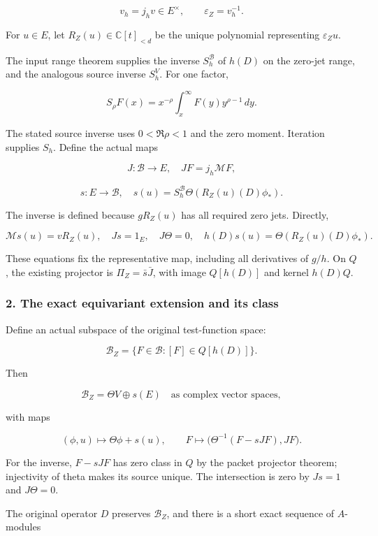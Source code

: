 \[v_h=j_hv\in E^\times,\qquad \varepsilon_Z=v_h^{-1}.\]

For \(u\in E\), let \(R_Z(u)\in\mathbb C[t]_{<d}\) be the unique polynomial representing
\(\varepsilon_Zu\).

The input range theorem supplies the inverse \(S_h^{\mathscr B}\) of \(h(D)\) on the zero-jet range,
and the analogous source inverse \(S_h^V\). For one factor,

\[S_\rho F(x)=x^{-\rho}\int_x^\infty F(y)y^{\rho-1}\,dy.\]

The stated source inverse uses \(0<\Re\rho<1\) and the zero moment. Iteration supplies \(S_h\).
Define the actual maps

\[J:\mathscr B\to E,\quad JF=j_h\mathcal MF,\]

\[s:E\to\mathscr B,\quad s(u)=S_h^{\mathscr B}\Theta(R_Z(u)(D)\phi_*).\]

The inverse is defined because \(gR_Z(u)\) has all required zero jets. Directly,

\[\mathcal Ms(u)=vR_Z(u),\quad Js=1_E,\quad J\Theta=0,\quad
h(D)s(u)=\Theta(R_Z(u)(D)\phi_*).\tag{1}\]

These equations fix the representative map, including all derivatives of \(g/h\). On \(Q\), the
existing projector is \(\Pi_Z=\bar s\bar J\), with image \(Q[h(D)]\) and kernel \(h(D)Q\).

\subsubsection{2. The exact equivariant extension and its
class}\label{pr_9:the-exact-equivariant-extension-and-its-class}

Define an actual subspace of the original test-function space:

\[\mathscr B_Z=\{F\in\mathscr B:[F]\in Q[h(D)]\}.\]

Then

\[\mathscr B_Z=\Theta V\oplus s(E)\quad\text{as complex vector spaces},\]

with maps

\[(\phi,u)\longmapsto\Theta\phi+s(u),\qquad
F\longmapsto\bigl(\Theta^{-1}(F-sJF),JF\bigr).\tag{2}\]

For the inverse, \(F-sJF\) has zero class in \(Q\) by the packet projector theorem; injectivity of
theta makes its source unique. The intersection is zero by \(Js=1\) and \(J\Theta=0\).

The original operator \(D\) preserves \(\mathscr B_Z\), and there is a short exact sequence of
\(A\)-modules


